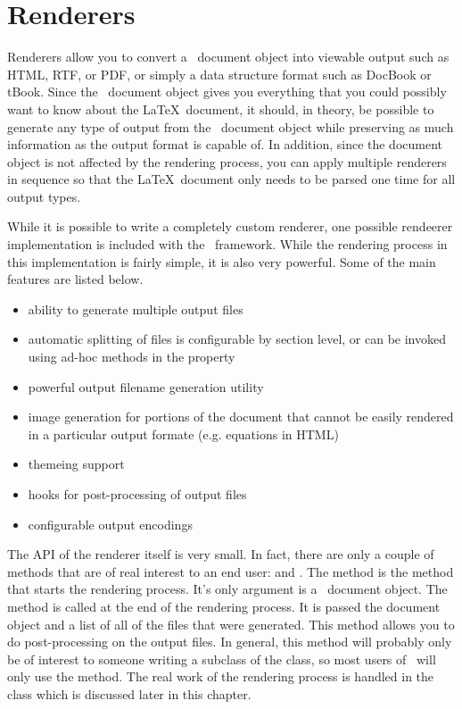 
\chapter{Renderers}

Renderers allow you to convert a \plasTeX\ document object into viewable
output such as HTML, RTF, or PDF, or simply a data structure format such
as DocBook or tBook.  Since the \plasTeX\ document object gives you
everything that you could possibly want to know about the \LaTeX\ document,
it should, in theory, be possible to generate any type of output from
the \plasTeX\ document object while preserving as much information as the
output format is capable of.  In addition, since the document object is
not affected by the rendering process, you can apply multiple renderers
in sequence so that the \LaTeX\ document only needs to be parsed one time
for all output types.

While it is possible to write a completely custom renderer, one possible
rendeerer implementation is included with the \plasTeX\ framework.
While the rendering process in this implementation is fairly simple,
it is also very powerful.  Some of the main features are listed below.
\begin{itemize}
\item ability to generate multiple output files
\item automatic splitting of files is configurable by section level,
    or can be invoked using ad-hoc methods in the
     property
\item powerful output filename generation utility
\item image generation for portions of the document that cannot be
    easily rendered in a particular output formate (e.g. equations in HTML)
\item themeing support
\item hooks for post-processing of output files
\item configurable output encodings
\end{itemize}

The API of the renderer itself is very small.  In fact, there are only
a couple of methods that are of real interest to an end user: 
and .  The  method is the method that starts
the rendering process.  It's only argument is a \plasTeX\ document object.
The  method is called at the end of the rendering process.
It is passed the document object and a list of all of the files that were
generated.  This method allows you to do post-processing on the output files.
In general, this method will probably only be of interest to someone
writing a subclass of the  class, so most users of
\plasTeX\ will only use the  method.  The real work of
the rendering process is handled in the  class which
is discussed later in this chapter.

